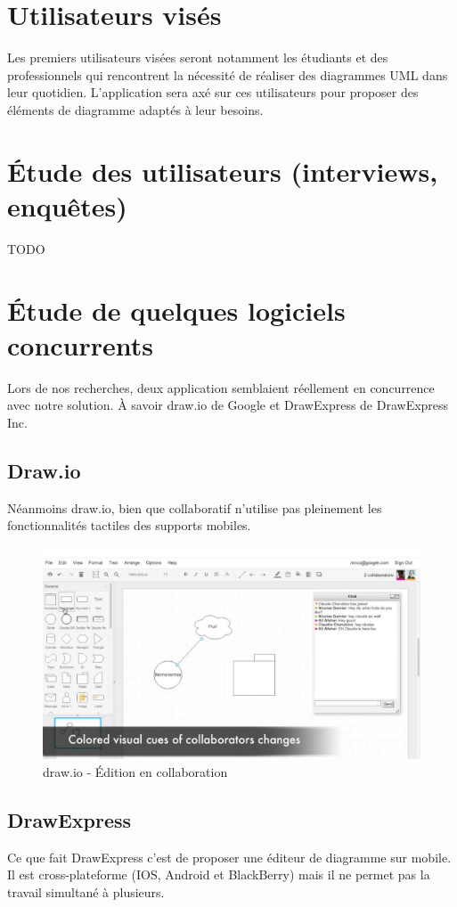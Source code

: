 \documentclass[a4paper,11pt]{article}
\begin{document}
\section{Utilisateurs visés}
Les premiers utilisateurs visées seront notamment les étudiants et des professionnels qui rencontrent la nécessité de réaliser des diagrammes UML dans leur quotidien.
L'application sera axé sur ces utilisateurs pour proposer des éléments de diagramme adaptés à leur besoins.




\section{Étude des utilisateurs (interviews, enquêtes)}
TODO

\newpage
\section{Étude de quelques logiciels concurrents}
Lors de nos recherches, deux application semblaient réellement en concurrence avec notre solution. À savoir draw.io de Google et DrawExpress de DrawExpress Inc.

\subsection{Draw.io}
Néanmoins draw.io, bien que collaboratif n'utilise pas pleinement les fonctionnalités tactiles des supports mobiles.

\begin{figure}[h]
	\centering
	\includegraphics[width=15cm]{img/drawio.PNG}
	\caption{draw.io - Édition en collaboration}
\end{figure}


\subsection{DrawExpress}
Ce que fait DrawExpress c’est de proposer une éditeur de diagramme sur mobile. Il est cross-plateforme (IOS, Android et BlackBerry) mais il ne permet pas la travail simultané à plusieurs.
\end{document}
